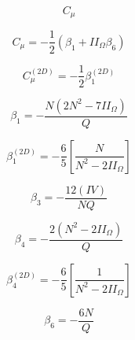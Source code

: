{\newpage\clearpage
{}%
\begin{displaymath}
C_{\mu}
\end{displaymath}%
\lthtmldisplayZ
\lthtmlcheckvsize\clearpage}

{\newpage\clearpage
{}%
\begin{displaymath}
C_{\mu} = -\frac{1}{2} \left( \beta_1 + II_{\Omega} \beta_6 \right)
\end{displaymath}%
\lthtmldisplayZ
\lthtmlcheckvsize\clearpage}

{\newpage\clearpage
{}%
\begin{displaymath}
C_{\mu}^{(2D)} = -\frac{1}{2} \beta_1^{(2D)}
\end{displaymath}%
\lthtmldisplayZ
\lthtmlcheckvsize\clearpage}

{\newpage\clearpage
{}%
\begin{displaymath}
\beta_1 = - \frac{N \left( 2 N^2 - 7 II_{\Omega} \right)}{Q}
\end{displaymath}%
\lthtmldisplayZ
\lthtmlcheckvsize\clearpage}

{\newpage\clearpage
{}%
\begin{displaymath}
\beta_1^{(2D)} = - \frac{6}{5} \left[\frac{N}{N^2 - 2 II_{\Omega} } \right]
\end{displaymath}%
\lthtmldisplayZ
\lthtmlcheckvsize\clearpage}

{\newpage\clearpage
{}%
\begin{displaymath}
\beta_3 = - \frac{12 (IV)}{NQ}
\end{displaymath}%
\lthtmldisplayZ
\lthtmlcheckvsize\clearpage}

{\newpage\clearpage
{}%
\begin{displaymath}
\beta_4 = - \frac{2 \left( N^2 - 2 II_{\Omega} \right)}{Q}
\end{displaymath}%
\lthtmldisplayZ
\lthtmlcheckvsize\clearpage}

{\newpage\clearpage
{}%
\begin{displaymath}
\beta_4^{(2D)} = - \frac{6}{5} \left[\frac{1}{N^2 - 2 II_{\Omega} } \right]
\end{displaymath}%
\lthtmldisplayZ
\lthtmlcheckvsize\clearpage}

{\newpage\clearpage
{}%
\begin{displaymath}
\beta_6 = - \frac{6 N}{Q}
\end{displaymath}%
\lthtmldisplayZ
\lthtmlcheckvsize\clearpage}

